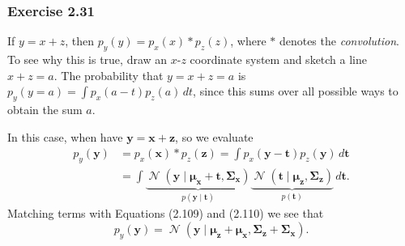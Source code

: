 \documentclass[12pt, a4paper]{article}
\newcommand{\vect}[1]{\bm{#1}}
\DeclareMathOperator{\N}{\mathcal{N}}
\begin{document}
\subsubsection*{Exercise 2.31}
If $y = x + z$, then $p_y(y) = p_x(x) * p_z(z)$, where $*$ denotes the \emph{convolution}.
To see why this is true, draw an $x$-$z$ coordinate system and sketch a line $x + z = a$.
The probability that $y = x + z = a$ is $p_y(y=a) = \int p_x(a - t) p_z(a) \, dt$, since this sums over all possible ways to obtain the sum $a$.

In this case, when have $\vect{y} = \vect{x} + \vect{z}$, so we evaluate
\begin{align*}
	p_y(\vect{y}) &= p_x(\vect{x}) * p_z(\vect{z}) = 
	\int p_x(\vect{y} - \vect{t}) p_z(\vect{y}) \, d \vect{t} \\
	&=
	\int 
	\underbrace{\N \left( \vect{y} \mid \vect{\mu}_{\vect{x}} + \vect{t} , \vect{\Sigma}_{\vect{x}} \right) }_{p(\vect{y} \mid \vect{t})}
	\underbrace{\N \left( \vect{t} \mid \vect{\mu}_{\vect{z}} , \vect{\Sigma}_{\vect{z}} \right)}_{p(\vect{t})}
	 \, d \vect{t}.
\end{align*}
Matching terms with Equations (2.109) and (2.110) we see that
\begin{equation*}
	p_y(\vect{y}) = \N \left( \vect{y} \mid 
	\vect{\mu}_{\vect{z}} + \vect{\mu}_{\vect{x}}
	, \vect{\Sigma}_{\vect{z}} + \vect{\Sigma}_{\vect{x}} \right).
\end{equation*}
\end{document}
